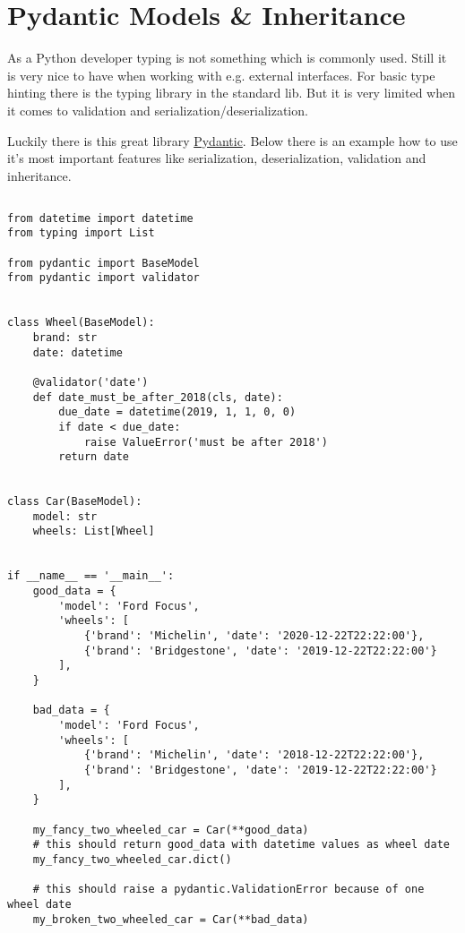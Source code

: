 \documentclass{article}
\begin{document}
  \section{Pydantic Models \& Inheritance}

  As a Python developer typing is not something which is commonly used. Still
  it is very nice to have when working with e.g. external interfaces. For basic
  type hinting there is the typing library in the standard lib. But it is very
  limited when it comes to validation and serialization/deserialization.

  Luckily there is this great library
  \href{https://pydantic-docs.helpmanual.io/}{Pydantic}.
  Below there is an example how to use it's most important features like
  serialization, deserialization, validation and inheritance.

  \subsection{}

  \begin{lstlisting}
from datetime import datetime
from typing import List

from pydantic import BaseModel
from pydantic import validator


class Wheel(BaseModel):
    brand: str
    date: datetime

    @validator('date')
    def date_must_be_after_2018(cls, date):
        due_date = datetime(2019, 1, 1, 0, 0)
        if date < due_date:
            raise ValueError('must be after 2018')
        return date


class Car(BaseModel):
    model: str
    wheels: List[Wheel]


if __name__ == '__main__':
    good_data = {
        'model': 'Ford Focus',
        'wheels': [
            {'brand': 'Michelin', 'date': '2020-12-22T22:22:00'},
            {'brand': 'Bridgestone', 'date': '2019-12-22T22:22:00'}
        ],
    }

    bad_data = {
        'model': 'Ford Focus',
        'wheels': [
            {'brand': 'Michelin', 'date': '2018-12-22T22:22:00'},
            {'brand': 'Bridgestone', 'date': '2019-12-22T22:22:00'}
        ],
    }

    my_fancy_two_wheeled_car = Car(**good_data)
    # this should return good_data with datetime values as wheel date
    my_fancy_two_wheeled_car.dict()

    # this should raise a pydantic.ValidationError because of one wheel date
    my_broken_two_wheeled_car = Car(**bad_data)

  \end{lstlisting}
\end{document}
